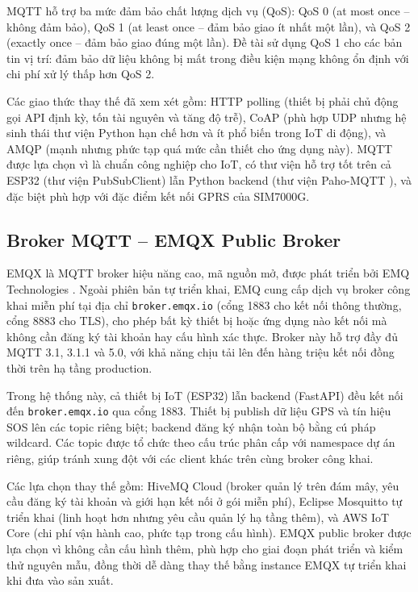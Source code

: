 \documentclass[../DoAn.tex]{subfiles}
\begin{document}
MQTT hỗ trợ ba mức đảm bảo chất lượng dịch vụ (QoS): QoS 0 (at most once – không đảm bảo), QoS 1 (at least once – đảm bảo giao ít nhất một lần), và QoS 2 (exactly once – đảm bảo giao đúng một lần). Đề tài sử dụng QoS 1 cho các bản tin vị trí: đảm bảo dữ liệu không bị mất trong điều kiện mạng không ổn định với chi phí xử lý thấp hơn QoS 2.

Các giao thức thay thế đã xem xét gồm: HTTP polling (thiết bị phải chủ động gọi API định kỳ, tốn tài nguyên và tăng độ trễ), CoAP (phù hợp UDP nhưng hệ sinh thái thư viện Python hạn chế hơn và ít phổ biến trong IoT di động), và AMQP (mạnh nhưng phức tạp quá mức cần thiết cho ứng dụng này). MQTT được lựa chọn vì là chuẩn công nghiệp cho IoT, có thư viện hỗ trợ tốt trên cả ESP32 (thư viện PubSubClient) lẫn Python backend (thư viện Paho-MQTT \cite{paho_mqtt}), và đặc biệt phù hợp với đặc điểm kết nối GPRS của SIM7000G.

\subsection{Broker MQTT – EMQX Public Broker}
\label{subsection:3.2.2}

EMQX là MQTT broker hiệu năng cao, mã nguồn mở, được phát triển bởi EMQ Technologies \cite{emqx_broker}. Ngoài phiên bản tự triển khai, EMQ cung cấp dịch vụ broker công khai miễn phí tại địa chỉ \texttt{broker.emqx.io} (cổng 1883 cho kết nối thông thường, cổng 8883 cho TLS), cho phép bất kỳ thiết bị hoặc ứng dụng nào kết nối mà không cần đăng ký tài khoản hay cấu hình xác thực. Broker này hỗ trợ đầy đủ MQTT 3.1, 3.1.1 và 5.0, với khả năng chịu tải lên đến hàng triệu kết nối đồng thời trên hạ tầng production.

Trong hệ thống này, cả thiết bị IoT (ESP32) lẫn backend (FastAPI) đều kết nối đến \texttt{broker.emqx.io} qua cổng 1883. Thiết bị publish dữ liệu GPS và tín hiệu SOS lên các topic riêng biệt; backend đăng ký nhận toàn bộ bằng cú pháp wildcard. Các topic được tổ chức theo cấu trúc phân cấp với namespace dự án riêng, giúp tránh xung đột với các client khác trên cùng broker công khai.

Các lựa chọn thay thế gồm: HiveMQ Cloud (broker quản lý trên đám mây, yêu cầu đăng ký tài khoản và giới hạn kết nối ở gói miễn phí), Eclipse Mosquitto tự triển khai (linh hoạt hơn nhưng yêu cầu quản lý hạ tầng thêm), và AWS IoT Core (chi phí vận hành cao, phức tạp trong cấu hình). EMQX public broker được lựa chọn vì không cần cấu hình thêm, phù hợp cho giai đoạn phát triển và kiểm thử nguyên mẫu, đồng thời dễ dàng thay thế bằng instance EMQX tự triển khai khi đưa vào sản xuất.
\end{document}
